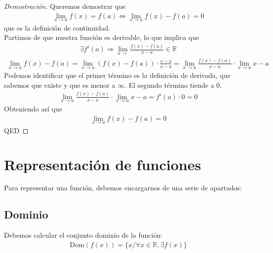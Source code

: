 \documentclass{article}
\begin{document}
\begin{proof}[Demostración]
    Queremos demostrar que
    \begin{equation}
        \begin{split}
            \lim_{x \to a} f(x)=f(a) \iff \lim_{x \to a} f(x)-f(a)=0
        \end{split}
    \end{equation}
    que es la definición de continuidad.\\
    Partimos de que nuestra función es derivable, lo que implica que
    \begin{equation}
        \begin{split}
            \exists f'(a) \Rightarrow \lim_{x \to} \frac{f(x)-f(a)}{x-a} \in \mathbb{R}
        \end{split}
    \end{equation}  
    \begin{equation}
        \begin{split}
            \lim_{x \to a} f(x)-f(a) = \lim_{x \to a} (f(x)-f(a)) \cdot \frac{x-a}{x-a}
            = \lim_{x \to a} \frac{f(x)-f(a)}{x-a} \cdot \lim_{x \to a} x-a
        \end{split}
    \end{equation}
Podemos identificar que el primer término es la definición de derivada, que sabemos que existe y
que es menor a $\infty$. El segundo término tiende a $0$.
\begin{equation}
    \begin{split}
        \lim_{x \to a} \frac{f(x)-f(a)}{x-a} \cdot \lim_{x \to a} x-a =f'(a) \cdot 0=0
    \end{split}
\end{equation}
Obteniendo así que
\begin{equation}
    \begin{split}
        \lim_{x \to a} f(x) -f(a)=0
    \end{split}
\end{equation}
QED
\end{proof}
\section{Representación de funciones}
Para representar una función, debemos encargarnos de una serie de apartados:
\subsection{Dominio}
Debemos calcular el conjunto dominio de la función:
\begin{equation}
    \begin{split}
        \mathrm{Dom}(f(x))= \{ x / \forall x \in \mathbb{R}, \exists f(x) \}
    \end{split}
\end{equation}
\end{document}
